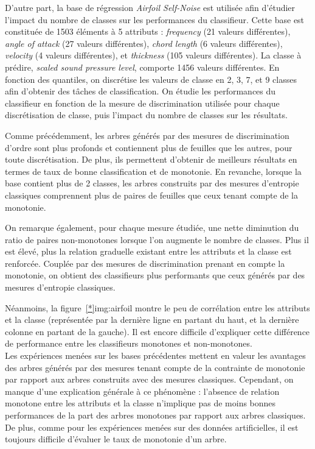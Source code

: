 \documentclass[a4paper]{article}
\newcommand{\figref}[1]{figure~\ref{#1}}
\begin{document}
D'autre part, la base de régression \emph{Airfoil Self-Noise} est utilisée afin
d'étudier l'impact du nombre de classes sur les performances du classifieur.
Cette base est constituée de 1503 éléments à 5 attributs : \emph{frequency} (21
valeurs différentes), \emph{angle of attack} (27 valeurs différentes),
\emph{chord length} (6 valeurs différentes), \emph{velocity} (4 valeurs
différentes), et \emph{thickness} (105 valeurs différentes). La classe à
prédire, \emph{scaled sound pressure level}, comporte 1456 valeurs différentes.
En fonction des quantiles, on discrétise les valeurs de classe en 2, 3, 7, et 9
classes afin d'obtenir des tâches de classification. On
étudie les performances du classifieur en fonction de la mesure de
discrimination utilisée pour chaque discrétisation de classe, puis l'impact du
nombre de classes sur les résultats.

Comme précédemment, les arbres générés par des mesures de discrimination d'ordre
sont plus profonds et contiennent plus de feuilles que les autres, pour toute
discrétisation. De plus, ils permettent d'obtenir de meilleurs résultats en
termes de taux de bonne classification et de monotonie. En revanche, lorsque la
base contient plus de 2 classes, les arbres construits par des mesures
d'entropie classiques comprennent plus de paires de feuilles que ceux tenant
compte de la monotonie. 

On remarque également, pour chaque mesure étudiée, une nette diminution du ratio
de paires non-monotones lorsque l'on augmente le nombre de classes. Plus il est
élevé, plus la relation graduelle existant entre les attributs et la classe est
renforcée. Couplée par des mesures de discrimination prenant en compte la
monotonie, on obtient des classifieurs plus performants que ceux générés par des
mesures d'entropie classiques.

Néanmoins, la \figref*{img:airfoil} montre le peu de corrélation entre les
attributs et la classe (représentée par la dernière ligne en partant du haut, et
la dernière colonne en partant de la gauche). Il est encore difficile
d'expliquer cette différence de performance entre les classifieurs monotones et
non-monotones. \\

Les expériences menées sur les bases précédentes mettent en valeur les avantages
des arbres générés par des mesures tenant compte de la contrainte de monotonie
par rapport aux arbres construits avec des mesures classiques. Cependant, on
manque d'une explication générale à ce phénomène : l'absence de relation
monotone entre les attributs et la classe n'implique pas de moins bonnes
performances de la part des arbres monotones par rapport aux arbres classiques.
De plus, comme pour les expériences menées sur des données artificielles, il est
toujours difficile d'évaluer le taux de monotonie d'un arbre.
\end{document}
